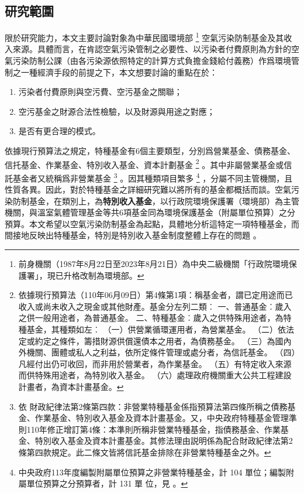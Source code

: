 \documentclass[12pt,a4paper]{article}
\begin{document}
\subsection{研究範圍}

限於研究能力，本文主要討論對象為中華民國環境部
\footnote{前身機關（1987年8月22日至2023年8月21日）為中央二級機關「行政院環境保護署」，現已升格改制為環境部。}
空氣污染防制基金及其收入來源。具體而言，在肯認空氣污染管制之必要性、以污染者付費原則為方針的空氣污染防制公課（由各污染源依照特定的計算方式負擔金錢給付義務）作爲環境管制之一種經濟手段的前提之下，本文想要討論的重點在於：
\begin{enumerate}[topsep=0.5em, partopsep=0pt, itemsep=0pt, parsep=0pt,leftmargin=3em]
  \item 污染者付費原則與空污費、空污基金之關聯；
  \item 空污基金之財源合法性檢驗，以及財源與用途之對應；
  \item 是否有更合理的模式。
  \end{enumerate}  


依據現行預算法之規定，特種基金有6個主要類型，分別爲營業基金、債務基金、信托基金、作業基金、特別收入基金、資本計劃基金
\footnote{依據現行預算法（110年06月09日）第4條第1項：稱基金者，謂已定用途而已收入或尚未收入之現金或其他財產。基金分左列二類︰
一、普通基金︰歲入之供一般用途者，為普通基金。
二、特種基金︰歲入之供特殊用途者，為特種基金，其種類如左︰
（一）供營業循環運用者，為營業基金。
（二）依法定或約定之條件，籌措財源供償還債本之用者，為債務基金。
（三）為國內外機關、團體或私人之利益，依所定條件管理或處分者，為信託基金。
（四）凡經付出仍可收回，而非用於營業者，為作業基金。
（五）有特定收入來源而供特殊用途者，為特別收入基金。
（六）處理政府機關重大公共工程建設計畫者，為資本計畫基金。}
。其中非屬營業基金或信託基金者又統稱爲非營業基金
\footnote{依 財政紀律法第2條第四款：非營業特種基金係指預算法第四條所稱之債務基金、作業基金、特別收入基金及資本計畫基金。又，中央政府特種基金管理準則110年修正增訂第4條：本準則所稱非營業特種基金，指債務基金、作業基金、特別收入基金及資本計畫基金。其修法理由説明係為配合財政紀律法第2條第四款規定。此二條文皆將信託基金排除在非營業特種基金之外。}
。因其種類項目繁多
\footnote{中央政府113年度編製附屬單位預算之非營業特種基金，計 104 單位；編製附屬單位預算之分預算者，計 131 單
位，見
。}
，分屬不同主管機關，且性質各異。因此，對於特種基金之詳細研究難以將所有的基金都概括而談。空氣污染防制基金，在類別上，為\textbf{特別收入基金}，以行政院環境保護署（環境部）為主管機關，與溫室氣體管理基金等共6項基金同為環境保護基金（附屬單位預算）之分預算。本文希望以空氣污染防制基金為起點，具體地分析這特定一項特種基金，而間接地反映出特種基金，特別是特別收入基金制度整體上存在的問題
。
\end{document}
